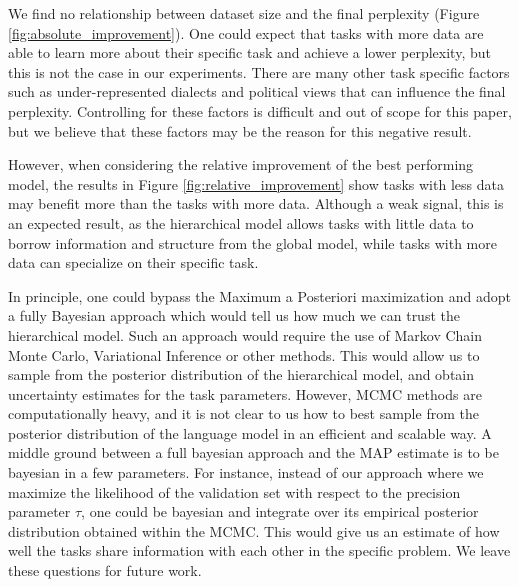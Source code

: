 \documentclass{article}
\begin{document}
We find no relationship between dataset size and the final perplexity (Figure \ref{fig:absolute_improvement}). One could expect that tasks with more data are able to learn more about their specific task and achieve a lower perplexity, but this is not the case in our experiments. There are many other task specific factors such as under-represented dialects and political views that can influence the final perplexity. Controlling for these factors is difficult and out of scope for this paper, but we believe that these factors may be the reason for this negative result.

However, when considering the relative improvement of the best performing model, the results in Figure \ref{fig:relative_improvement} show tasks with less data may benefit more than the tasks with more data. Although a weak signal, this is an expected result, as the hierarchical model allows tasks with little data to borrow information and structure from the global model, while tasks with more data can specialize on their specific task.

In principle, one could bypass the Maximum a Posteriori maximization and adopt a fully Bayesian approach which would tell us how much we can trust the hierarchical model. Such an approach  would require the use of Markov Chain Monte Carlo, Variational Inference or other methods.
This would allow us to sample from the posterior distribution of the hierarchical model, and obtain uncertainty estimates for the task parameters.
However, MCMC methods are computationally heavy, and it is not clear to us how to best sample from the posterior distribution of the language model in an efficient and scalable way.
A middle ground between a full bayesian approach and the MAP estimate is to be bayesian in a few parameters. For instance, instead of our approach where we maximize the likelihood of the validation set with respect to the precision parameter $\tau$, one could be bayesian and integrate over its empirical posterior distribution obtained within the MCMC. This would give us an estimate of how well the tasks share information with each other in the specific problem.
We leave these questions for future work.
\end{document}

